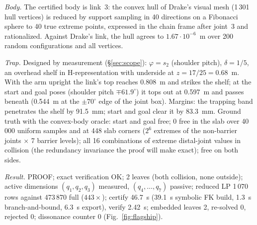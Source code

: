 \documentclass[10pt,twocolumn,letterpaper]{article}
\newcommand{\vphi}{\varphi}
\begin{document}
\emph{Body.} The certified body is link~3: the convex hull of Drake's visual mesh (1\,301 hull vertices) is reduced by support sampling in 40 directions on a Fibonacci sphere to 40 true extreme points, expressed in the chain frame after joint~3 and rationalized. Against Drake's link, the hull agrees to $1.67\cdot10^{-6}$~m over 200 random configurations and all vertices.

\emph{Trap.} Designed by measurement (\S\ref{sec:scope}): $\vphi=s_2$ (shoulder pitch), $\delta=1/5$, an overhead shelf in H-representation with underside at $z=17/25=0.68$~m. With the arm upright the link's top reaches 0.808~m and strikes the shelf; at the start and goal poses (shoulder pitch $\mp61.9^\circ$) it tops out at 0.597~m and passes beneath (0.544~m at the $\pm70^\circ$ edge of the joint box). Margins: the trapping band penetrates the shelf by 91.5~mm; start and goal clear it by 83.3~mm. Ground truth with the convex-body oracle: start and goal free; 0 free in the slab over 40\,000 uniform samples and at 448 slab corners ($2^6$ extremes of the non-barrier joints $\times$ 7 barrier levels); all 16 combinations of extreme distal-joint values in collision (the redundancy invariance the proof will make exact); free on both sides.

\emph{Result.} PROOF; exact verification OK; 2 leaves (both collision, none outside); active dimensions $(q_1,q_2,q_3)$ measured, $(q_4,\dots,q_7)$ passive; reduced LP 1\,070 rows against 473\,870 full ($443\times$); certify 46.7~s (39.1~s symbolic FK build, 1.3~s branch-and-bound, 6.3~s export), verify 2.42~s; embedded leaves 2, re-solved 0, rejected 0; dissonance counter 0 (Fig.~\ref{fig:flagship}).
\end{document}
